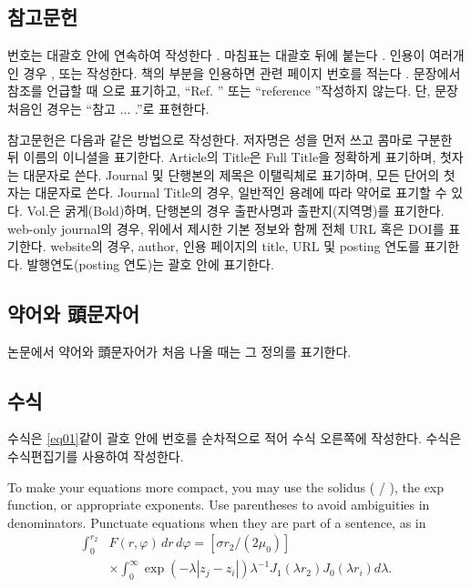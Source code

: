 \documentclass{fullpaper_hutech}
\begin{document}

\subsection{참고문헌}

번호는 대괄호 안에 연속하여 작성한다 \cite{True00}. 마침표는 대괄호 뒤에 붙는다 \cite{Schluter00}. 인용이 여러개인 경우 \cite{Schluter00}, \cite{Plazzo11} 또는 \cite{True00,Schluter00,Plazzo11} 작성한다. 책의 부분을 인용하면 관련 페이지 번호를 적는다 \cite{Schluter00}. 문장에서 참조를 언급할 때 \cite{Plazzo11}으로 표기하고, ``Ref. \cite{Plazzo11}'' 또는 ``reference \cite{Plazzo11}''\로 작성하지 않는다. 단, 문장 처음인 경우는 ``참고 \cite{Plazzo11}\은 ... .''로 표현한다.

참고문헌은 다음과 같은 방법으로 작성한다. 저자명은 성을 먼저 쓰고 콤마로 구분한 뒤 이름의 이니셜을 표기한다. Article의 Title은 Full Title을 정확하게 표기하며, 첫자는 대문자로 쓴다. Journal 및 단행본의 제목은 이탤릭체로 표기하며, 모든 단어의 첫자는 대문자로 쓴다. Journal Title의 경우, 일반적인 용례에 따라 약어로 표기할 수 있다.  Vol.은 굵게(Bold)하며, 단행본의 경우 출판사명과 출판지(지역명)를 표기한다. web-only journal의 경우, 위에서 제시한 기본 정보와 함께 전체 URL 혹은 DOI를 표기한다. website의 경우, author, 인용 페이지의 title, URL 및 posting 연도를 표기한다.  발행연도(posting 연도)는 괄호 안에 표기한다.

\subsection{약어와 頭문자어}

논문에서 약어와 頭문자어가 처음 나올 때는 그 정의를 표기한다.

\subsection{수식}

수식은 \eqref{eq01}\와 같이 괄호 안에 번호를 순차적으로 적어 수식 오른쪽에 작성한다. 수식은 수식편집기를 사용하여 작성한다. 

To make your equations more compact, you may use the solidus ( / ), the exp function, or appropriate exponents. Use parentheses to avoid ambiguities in denominators. Punctuate equations when they are part of a sentence, as in
\begin{equation}\label{eq01}
\begin{split}\int_0^{r_2} &F(r,\varphi)\,dr\,d\varphi=[\sigma r_2 /(2\mu_0 )] \\
&\times\int_0^{\infty} \exp(-\lambda |z_j -z_i |)\lambda^{-1} J_1 (\lambda r_2 )J_0 (\lambda r_i )d\lambda.\end{split}
\end{equation}
\end{document}
